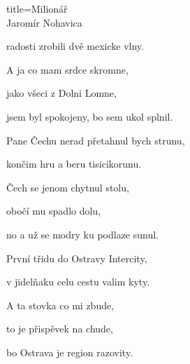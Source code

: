 \begin{song}{title=\centering Milionář \\\normalsize Jaromír Nohavica  \vspace*{-0.3cm}}
\begin{centerjustified}
\begin{minipage}[t]{0.5\textwidth}
radosti zrobili dvě mexicke vlny. 

A ja co mam srdce skromne, 

jako všeci z Dolni Lomne, 

jsem byl spokojeny, bo sem ukol splnil. 

\sloka
Pane Čechu nerad přetahnul bych strunu, 

končim hru a beru tisicikorunu. 

Čech se jenom chytnul stolu, 

obočí mu spadlo dolu, 

no a už se modry ku podlaze sunul. 

\sloka
První třidu do Ostravy Intercity, 

v jidelňaku celu cestu valim kyty.

A ta stovka co mi zbude, 

to je přispěvek na chude, 

bo Ostrava je region razovity.


\end{minipage}
\end{centerjustified}
\setcounter{Slokočet}{0}
\end{song}
